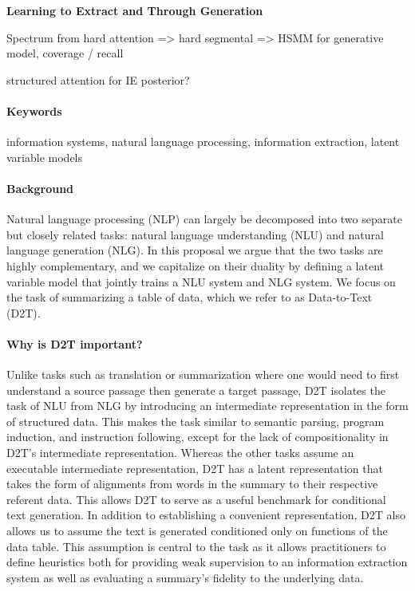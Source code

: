 \documentclass[11pt]{article}
\begin{document}

\begin{center}
\textbf{Learning to Extract and Through Generation}
\end{center}

Spectrum from hard attention => hard segmental => HSMM for generative model, coverage / recall

structured attention for IE posterior?

\paragraph{Keywords}
information systems, natural language processing, information extraction,
latent variable models

\paragraph{Background}
Natural language processing (NLP) can largely be decomposed into two separate but
closely related tasks: natural language understanding (NLU) and natural language
generation (NLG).
In this proposal we argue that the two tasks are highly complementary,
and we capitalize on their duality by defining a latent variable model
that jointly trains a NLU system and NLG system.
We focus on the task of summarizing a table of data,
which we refer to as Data-to-Text (D2T).

\paragraph{Why is D2T important?}
Unlike tasks such as translation or summarization where one would
need to first understand a source passage then generate a target passage,
D2T isolates the task of NLU from NLG by introducing an intermediate representation in
the form of structured data.
This makes the task similar to semantic parsing, program induction, and instruction following,
except for the lack of compositionality in D2T's intermediate representation.
Whereas the other tasks assume an executable intermediate representation,
D2T has a latent representation that takes the form of alignments from 
words in the summary to their respective referent data.
This allows D2T to serve as a useful benchmark for conditional text generation.
In addition to establishing a convenient representation,
D2T also allows us to assume the text is generated conditioned only on
functions of the data table.
This assumption is central to the task as it allows
practitioners to define heuristics both for providing weak supervision to an
information extraction system as well as evaluating a summary's fidelity
to the underlying data.
\end{document}

